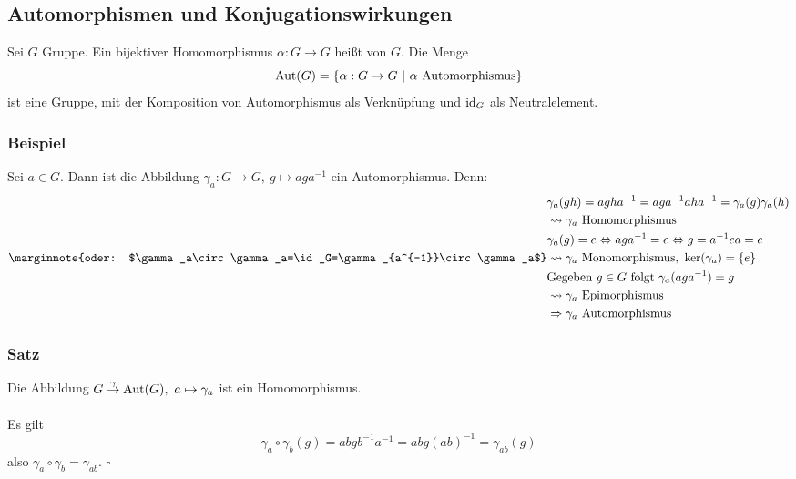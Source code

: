 
\subsection{Automorphismen und Konjugationswirkungen}
\label{sub:automor}
Sei $G$ Gruppe. 
Ein bijektiver Homomorphismus $\alpha:G\to G$ heißt  von $G$. 
Die Menge 
\[
\operatorname{Aut}(G)=\{\alpha:G\to G~|~\alpha \text{ Automorphismus}\} 
\]
ist eine Gruppe, mit der Komposition von Automorphismus als Verknüpfung und $\operatorname{id}_G$ als Neutralelement.

\subsubsection*{Beispiel}
Sei $a\in G$. 
Dann ist die Abbildung $\gamma_a:G\to G,~g\mapsto aga^{-1}$ ein Automorphismus. 
Denn:
\begin{equation*}
\begin{aligned}
	&\gamma_a(gh)=agha^{-1}=aga^{-1}aha^{-1}=\gamma_a(g)\gamma_a(h)\\
	&\rightsquigarrow \gamma_a \text{ Homomorphismus}\\
	&\gamma_a(g)=e \Leftrightarrow aga^{-1}=e \Leftrightarrow g=a^{-1}ea=e\\
	\marginnote{oder: $\gamma_a\circ\gamma_a=\id_G=\gamma_{a^{-1}}\circ\gamma_a$}
	&\rightsquigarrow \gamma_a \text{ Monomorphismus},~ \ker(\gamma_a)=\{e\}\\
	&\text{Gegeben } g\in G \text{ folgt } \gamma_a(aga^{-1})=g\\
	&\rightsquigarrow \gamma_a \text{ Epimorphismus}\\
	&\Rightarrow \gamma_a \text{ Automorphismus}
\end{aligned}
\end{equation*}

\subsubsection*{Satz}
Die Abbildung $G\stackrel{\gamma}{\to} \operatorname{Aut}(G),~a\mapsto \gamma_a$ ist ein Homomorphismus.\\

\\
Es gilt 
\[
\gamma_a\circ\gamma_b(g)=abgb^{-1}a^{-1}=abg(ab)^{-1}=\gamma_{ab}(g) 
\]
also $\gamma_a\circ\gamma_b=\gamma_{ab}$.
\hfill $\square$\\

